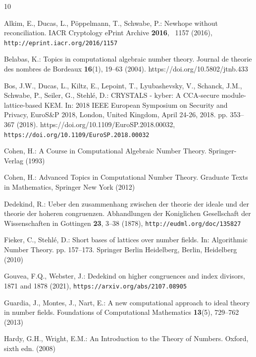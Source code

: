 \documentclass[runningheads, letter]{llncs}
\begin{document}
\begin{thebibliography}{10}
\providecommand{\url}[1]{\texttt{#1}}
\providecommand{\urlprefix}{URL }
\providecommand{\doi}[1]{https://doi.org/#1}

Alkim, E., Ducas, L., P{\"{o}}ppelmann, T., Schwabe, P.: Newhope without
  reconciliation. {IACR} Cryptology ePrint Archive  \textbf{2016}, ~1157
  (2016), \url{http://eprint.iacr.org/2016/1157}

Belabas, K.: Topics in computational algebraic number theory. Journal de
  theorie des nombres de Bordeaux  \textbf{16}(1),  19--63 (2004).
  \doi{10.5802/jtnb.433}

Bos, J.W., Ducas, L., Kiltz, E., Lepoint, T., Lyubashevsky, V., Schanck, J.M.,
  Schwabe, P., Seiler, G., Stehl{\'{e}}, D.: {CRYSTALS} - kyber: {A}
  {CCA}-secure module-lattice-based {KEM}. In: 2018 {IEEE} European Symposium
  on Security and Privacy, EuroS{\&}P 2018, London, United Kingdom, April
  24-26, 2018. pp. 353--367 (2018). \doi{10.1109/EuroSP.2018.00032},
  \url{https://doi.org/10.1109/EuroSP.2018.00032}

Cohen, H.: A Course in Computational Algebraic Number Theory. Springer-Verlag
  (1993)

Cohen, H.: Advanced Topics in Computational Number Theory. Graduate Texts in
  Mathematics, Springer New York (2012)

Dedekind, R.: Ueber den zusammenhang zwischen der theorie der ideale und der
  theorie der hoheren congruenzen. Abhandlungen der Koniglichen Gesellschaft
  der Wissenschaften in Gottingen  \textbf{23},  3--38 (1878),
  \url{http://eudml.org/doc/135827}

Fieker, C., Stehl{\'e}, D.: Short bases of lattices over number fields. In:
  Algorithmic Number Theory. pp. 157--173. Springer Berlin Heidelberg, Berlin,
  Heidelberg (2010)

Gouvea, F.Q., Webster, J.: Dedekind on higher congruences and index divisors,
  1871 and 1878 (2021), \url{https://arxiv.org/abs/2107.08905}

Guardia, J., Montes, J., Nart, E.: A new computational approach to ideal theory
  in number fields. Foundations of Computational Mathematics  \textbf{13}(5),
  729--762 (2013)

Hardy, G.H., Wright, E.M.: An Introduction to the Theory of Numbers. Oxford,
  sixth edn. (2008)


\end{thebibliography}
\end{document}
